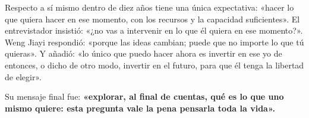 Respecto a sí mismo dentro de diez años tiene una única expectativa: «hacer lo que quiera hacer en ese momento, con los recursos y la capacidad suficientes». El entrevistador insistió: «¿no vas a intervenir en lo que él quiera en ese momento?». Weng Jiayi respondió: «porque las ideas cambian; puede que no importe lo que tú quieras». Y añadió: «lo único que puedo hacer ahora es invertir en ese yo de entonces, o dicho de otro modo, invertir en el futuro, para que él tenga la libertad de elegir».

Su mensaje final fue: \textbf{«explorar, al final de cuentas, qué es lo que uno mismo quiere: esta pregunta vale la pena pensarla toda la vida».}

